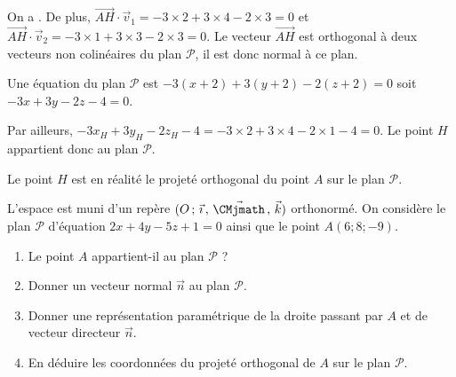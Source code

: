 \documentclass[11pt,fleqn, openany]{book} %
\begin{document}
\begin{solution}On a . De plus, $\overrightarrow{AH}\cdot \vec v_1=-3 \times 2 + 3 \times 4 -2 \times 3 =0$ et $\overrightarrow{AH}\cdot \vec v_2=-3 \times 1 + 3 \times 3 -2 \times 3 =0$. Le vecteur $\overrightarrow{AH}$ est orthogonal à deux vecteurs non colinéaires du plan $\mathcal{P}$, il est donc normal à ce plan.

Une équation du plan $\mathcal{P}$ est $-3(x+2)+3(y+2)-2(z+2)=0$ soit $-3x+3y-2z-4=0$.

Par ailleurs, $-3x_H+3y_H-2z_H-4=-3 \times 2 +3 \times 4 -2 \times 1 -4 = 0$. Le point $H$ appartient donc au plan $\mathcal{P}$.

Le point $H$ est en réalité le projeté orthogonal du point $A$ sur le plan $\mathcal{P}$.\end{solution}



\begin{exercise}
L'espace est muni d'un repère $\Oijk$ orthonormé. On considère le plan $\mathcal{P}$ d'équation $2x+4y-5z+1=0$ ainsi que le point $A(6;8;-9)$.

\begin{enumerate}
\item Le point $A$ appartient-il au plan $\mathcal{P}$ ?
\item Donner un vecteur normal $\vec n$ au plan $\mathcal{P}$.
\item Donner une représentation paramétrique de la droite passant par $A$ et de vecteur directeur $\vec n$.
\item En déduire les coordonnées du projeté orthogonal de $A$ sur le plan $\mathcal{P}$.
\end{enumerate}\end{exercise}
\end{document}
